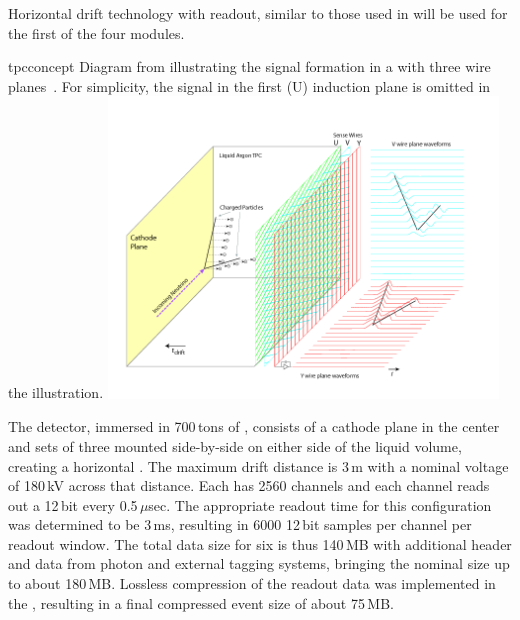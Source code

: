 \documentclass[../main-v1.tex]{subfiles}
\begin{document}
Horizontal drift  technology with  readout, similar to those used in   will be used for the first of the four  modules. 


\begin{dunefigure}
{tpcconcept} %
{Diagram  from    illustrating the signal formation in a  with three wire planes~\cite{Acciarri:2016smi}. For simplicity, the signal in the first (U) induction plane is omitted in the illustration. }
\includegraphics[trim={0cm 0.6cm 2.5cm 0.7cm},clip,height=8cm]{graphics/IntroFigures/Fig_04_LArTPC_Concept.png}
\end{dunefigure}

The  detector, immersed in 700\,tons of , consists of %
a cathode plane in the center and sets of three  mounted side-by-side on %
either side of the liquid volume, creating a horizontal \efield. %
The maximum drift distance is  3\,m with  a nominal voltage of 180\,kV  across that distance.  Each  has 2560 channels and each channel reads out a 12\,bit  every 0.5\,$\mu$sec. %
The appropriate readout time for this configuration was determined to be 3\,ms, resulting in 6000 12\,bit samples per channel per readout window. 
The total data size for six  is thus 140\,MB with additional header and data from photon and external tagging systems, bringing the nominal  size up to about 180\,MB.  Lossless compression of the  readout data was implemented in the , resulting in a final compressed event size of about 75\,MB. 
\end{document}
